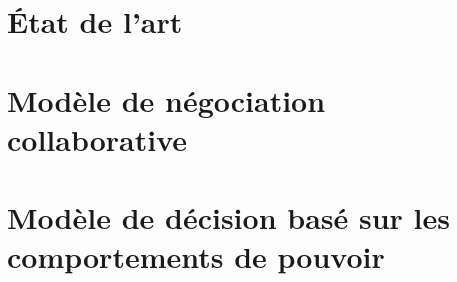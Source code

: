 \documentclass[a4paper, 11pt]{book}
\begin{document}
	
	\chapter{État de l'art }
	
	\chapter{Modèle de négociation collaborative}
		\minitoc
%		
	
%	
	\chapter{Modèle de décision basé sur les comportements de pouvoir}
	\minitoc
	

%
%	
%
%		

	
	
\end{document}
